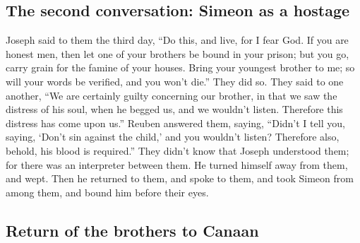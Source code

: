 \hypertarget{the-second-conversation-simeon-as-a-hostage}{%
\subsection{The second conversation: Simeon as a
hostage}\label{the-second-conversation-simeon-as-a-hostage}}

 Joseph said to them the third day, ``Do this, and live,
for I fear God.  If you are honest men, then let one of
your brothers be bound in your prison; but you go, carry grain for the
famine of your houses.  Bring your youngest brother to
me; so will your words be verified, and you won't die.'' They did so.
 They said to one another, ``We are certainly guilty
concerning our brother, in that we saw the distress of his soul, when he
begged us, and we wouldn't listen. Therefore this distress has come upon
us.''  Reuben answered them, saying, ``Didn't I tell you,
saying, `Don't sin against the child,' and you wouldn't listen?
Therefore also, behold, his blood is required.''  They
didn't know that Joseph understood them; for there was an interpreter
between them.  He turned himself away from them, and
wept. Then he returned to them, and spoke to them, and took Simeon from
among them, and bound him before their eyes.

\hypertarget{return-of-the-brothers-to-canaan}{%
\subsection{Return of the brothers to
Canaan}\label{return-of-the-brothers-to-canaan}}

